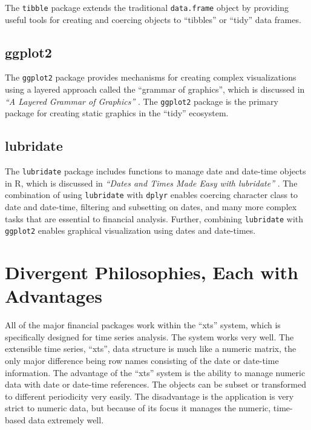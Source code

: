 The \texttt{tibble} package extends the traditional \texttt{data.frame}
object by providing useful tools for creating and coercing objects to
``tibbles'' or ``tidy'' data frames.

\subsection{ggplot2}\label{ggplot2}

The \texttt{ggplot2} package provides mechanisms for creating complex
visualizations using a layered approach called the ``grammar of
graphics'', which is discussed in \emph{``A Layered Grammar of
Graphics''} \citep{layered-grammar}. The \texttt{ggplot2} package is the
primary package for creating static graphics in the ``tidy'' ecosystem.

\subsection{lubridate}\label{lubridate}

The \texttt{lubridate} package includes functions to manage date and
date-time objects in R, which is discussed in \emph{``Dates and Times
Made Easy with lubridate''} \citep{lubridate}. The combination of using
\texttt{lubridate} with \texttt{dplyr} enables coercing character class
to date and date-time, filtering and subsetting on dates, and many more
complex tasks that are essential to financial analysis. Further,
combining \texttt{lubridate} with \texttt{ggplot2} enables graphical
visualization using dates and date-times.

\section{Divergent Philosophies, Each with
Advantages}\label{divergent-philosophies-each-with-advantages}

All of the major financial packages work within the ``xts'' system,
which is specifically designed for time series analysis. The system
works very well. The extensible time series, ``xts'', data structure is
much like a numeric matrix, the only major difference being row names
consisting of the date or date-time information. The advantage of the
``xts'' system is the ability to manage numeric data with date or
date-time references. The objects can be subset or transformed to
different periodicity very easily. The disadvantage is the application
is very strict to numeric data, but because of its focus it manages the
numeric, time-based data extremely well.

